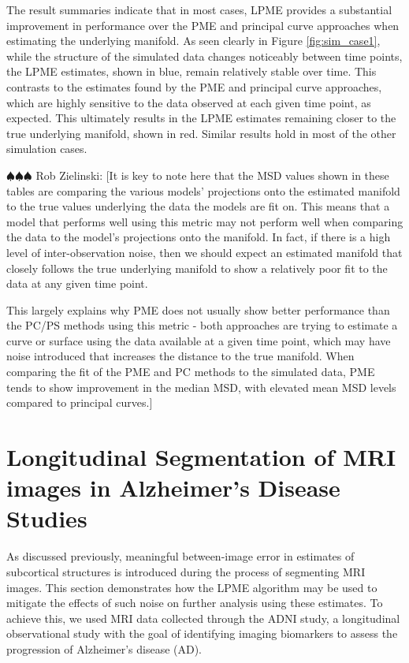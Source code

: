 \documentclass[11pt,reqno]{article}
\newcommand{\zielinski}[1]{{\color{blue} \sf $\spadesuit\spadesuit\spadesuit$ Rob Zielinski: [#1]}}
\theoremstyle{definition}
\begin{document}
The result summaries indicate that in most cases, LPME provides a substantial improvement in performance over the PME and principal curve approaches when estimating the underlying manifold. As seen clearly in Figure \ref{fig:sim_case1}, while the structure of the simulated data changes noticeably between time points, the LPME estimates, shown in blue, remain relatively stable over time. This contrasts to the estimates found by the PME and principal curve approaches, which are highly sensitive to the data observed at each given time point, as expected. This ultimately results in the LPME estimates remaining closer to the true underlying manifold, shown in red. Similar results hold in most of the other simulation cases.

\zielinski{It is key to note here that the MSD values shown in these tables are comparing the various models' projections onto the estimated manifold to the true values underlying the data the models are fit on. This means that a model that performs well using this metric may not perform well when comparing the data to the model's projections onto the manifold. In fact, if there is a high level of inter-observation noise, then we should expect an estimated manifold that closely follows the true underlying manifold to show a relatively poor fit to the data at any given time point.

This largely explains why PME does not usually show better performance than the PC/PS methods using this metric - both approaches are trying to estimate a curve or surface using the data available at a given time point, which may have noise introduced that increases the distance to the true manifold. When comparing the fit of the PME and PC methods to the simulated data, PME tends to show improvement in the median MSD, with elevated mean MSD levels compared to principal curves.}

\section{Longitudinal Segmentation of MRI images in Alzheimer's Disease Studies}\label{s:application}

As discussed previously, meaningful between-image error in estimates of subcortical structures is introduced during the process of segmenting MRI images. This section demonstrates how the LPME algorithm may be used to mitigate the effects of such noise on further analysis using these estimates. To achieve this, we used MRI data collected through the ADNI study, a longitudinal observational study with the goal of identifying imaging biomarkers to assess the progression of Alzheimer's disease (AD). 
\end{document}

